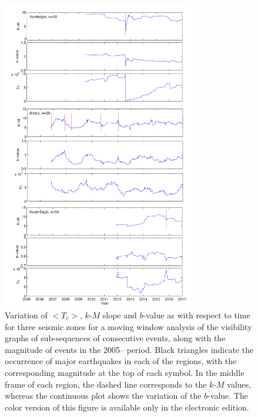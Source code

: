 \begin{figure}%
	\centering
	\includegraphics[width=0.75\textwidth]{figures/pdf/figure-09-rev.pdf} 
	\caption{Variation of $<$$T_c$$>$, $k$-$M$ slope and $b$-value as with respect to time for three seismic zones for a moving window analysis of the visibility graphs of sub-sequences of  consecutive events, along with the magnitude of events in the 2005-- period. Black triangles indicate the occurrence of major earthquakes in each of the regions, with the corresponding magnitude at the top of each symbol. In the middle frame of each region, the dashed line corresponds to the $k$-$M$ values, whereas the continuous plot shows the variation of the $b$-value. The color version of this figure is available only in the electronic edition.}
	\label{fig:tc}
\end{figure}


